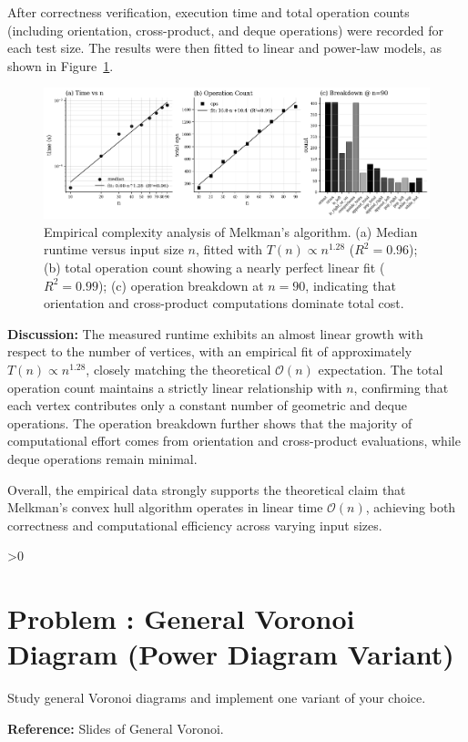 \documentclass{article}
\newcounter{ProblemCounter}
\newcounter{oldvalue}
\newcommand{\problem}[2][-1]{
	\setcounter{oldvalue}{\value{secnumdepth}}
	\setcounter{secnumdepth}{0}
	\ifnum#1>0
		\setcounter{ProblemCounter}{#1}
	\else
		\stepcounter{ProblemCounter}
	\fi
	\section{Problem \arabic{ProblemCounter}: #2}
	\setcounter{secnumdepth}{\value{oldvalue}}
}
\begin{document}
After correctness verification, execution time and total operation counts (including orientation, cross-product, and deque operations) were recorded for each test size. 
The results were then fitted to linear and power-law models, as shown in Figure~\ref{fig:complexity}.

\begin{figure}[H]
    \centering
    \includegraphics[width=0.95\linewidth]{Pictures/melkman_complexity.png}
    \caption{Empirical complexity analysis of Melkman’s algorithm. 
    (a) Median runtime versus input size $n$, fitted with $T(n)\propto n^{1.28}$ ($R^2=0.96$); 
    (b) total operation count showing a nearly perfect linear fit ($R^2=0.99$); 
    (c) operation breakdown at $n=90$, indicating that orientation and cross-product computations dominate total cost.}
    \label{fig:complexity}
\end{figure}

\textbf{Discussion:}
The measured runtime exhibits an almost linear growth with respect to the number of vertices, with an empirical fit of approximately $T(n)\!\propto\!n^{1.28}$, closely matching the theoretical $\mathcal{O}(n)$ expectation. 
The total operation count maintains a strictly linear relationship with $n$, confirming that each vertex contributes only a constant number of geometric and deque operations. 
The operation breakdown further shows that the majority of computational effort comes from orientation and cross-product evaluations, while deque operations remain minimal.

Overall, the empirical data strongly supports the theoretical claim that Melkman’s convex hull algorithm operates in linear time $\mathcal{O}(n)$, achieving both correctness and computational efficiency across varying input sizes.


\setcounter{Psec}{0}
\setcounter{Psubsec}{0}
\newpage
\problem{General Voronoi Diagram (Power Diagram Variant)}

Study general Voronoi diagrams and implement one variant of your choice.\bigskip

\noindent \textbf{Reference:} Slides of General Voronoi.
\end{document}
